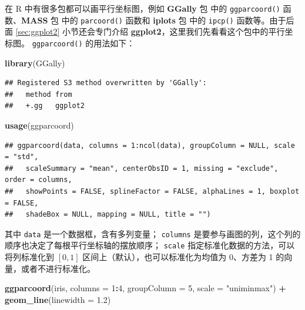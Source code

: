 \documentclass[
  b5paper,
  UTF8,twoside]{book}
\newenvironment{Shaded}{\begin{snugshade}}{\end{snugshade}}
\newcommand{\AttributeTok}[1]{\textcolor[rgb]{0.13,0.29,0.53}{#1}}
\newcommand{\DecValTok}[1]{\textcolor[rgb]{0.00,0.00,0.81}{#1}}
\newcommand{\FloatTok}[1]{\textcolor[rgb]{0.00,0.00,0.81}{#1}}
\newcommand{\FunctionTok}[1]{\textcolor[rgb]{0.13,0.29,0.53}{\textbf{#1}}}
\newcommand{\NormalTok}[1]{#1}
\newcommand{\SpecialCharTok}[1]{\textcolor[rgb]{0.81,0.36,0.00}{\textbf{#1}}}
\newcommand{\StringTok}[1]{\textcolor[rgb]{0.31,0.60,0.02}{#1}}
\begin{document}
在 R 中有很多包都可以画平行坐标图，例如 \textbf{GGally} 包 \citep{GGally} 中的 \texttt{ggparcoord()} 函数、\textbf{MASS} 包 \citep{Venables02} 中的 \texttt{parcoord()} 函数和 \textbf{iplots} 包 \citep{iplots} 中的 \texttt{ipcp()} 函数等。由于后面 \ref{sec:ggplot2} 小节还会专门介绍 \textbf{ggplot2}，这里我们先看看这个包中的平行坐标图。 \texttt{ggparcoord()} 的用法如下：

\begin{Shaded}
\begin{Highlighting}[]
\FunctionTok{library}\NormalTok{(GGally)}
\end{Highlighting}
\end{Shaded}

\begin{verbatim}
## Registered S3 method overwritten by 'GGally':
##   method from   
##   +.gg   ggplot2
\end{verbatim}

\begin{Shaded}
\begin{Highlighting}[]
\FunctionTok{usage}\NormalTok{(ggparcoord)}
\end{Highlighting}
\end{Shaded}

\begin{verbatim}
## ggparcoord(data, columns = 1:ncol(data), groupColumn = NULL, scale = "std",
##   scaleSummary = "mean", centerObsID = 1, missing = "exclude", order = columns,
##   showPoints = FALSE, splineFactor = FALSE, alphaLines = 1, boxplot = FALSE,
##   shadeBox = NULL, mapping = NULL, title = "")
\end{verbatim}

其中 \texttt{data} 是一个数据框，含有多列变量； \texttt{columns} 是要参与画图的列，这个列的顺序也决定了每根平行坐标轴的摆放顺序； \texttt{scale} 指定标准化数据的方法，可以将列标准化到 \([0, 1]\) 区间上（默认），也可以标准化为均值为 0、方差为 1 的向量，或者不进行标准化。





\begin{Shaded}
\begin{Highlighting}[]
\FunctionTok{ggparcoord}\NormalTok{(iris, }\AttributeTok{columns =} \DecValTok{1}\SpecialCharTok{:}\DecValTok{4}\NormalTok{, }\AttributeTok{groupColumn =} \DecValTok{5}\NormalTok{, }\AttributeTok{scale =} \StringTok{"uniminmax"}\NormalTok{) }\SpecialCharTok{+} 
  \FunctionTok{geom\_line}\NormalTok{(}\AttributeTok{linewidth =} \FloatTok{1.2}\NormalTok{)}
\end{Highlighting}
\end{Shaded}
\end{document}
